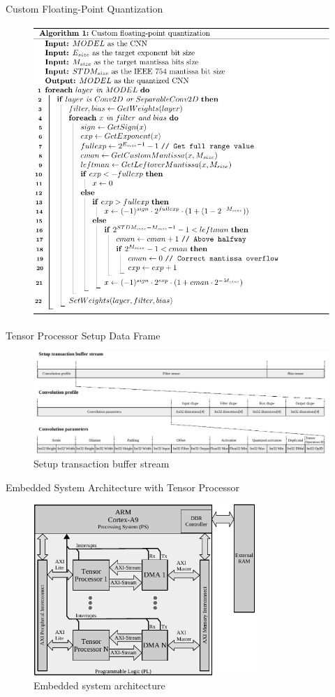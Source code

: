 \begin{frame}{Custom Floating-Point Quantization}
	\begin{figure}
		\centering
		\includegraphics[width=0.6\columnwidth]{slides/algorithm_fp_2.pdf}
	\end{figure}
	
\end{frame}

\begin{frame}{Tensor Processor Setup Data Frame}
	
	\begin{figure}
		\includegraphics[width=\textwidth]{../figures/setup_transaction_buffer_stream.pdf}
		\caption{Setup transaction buffer stream}
	\end{figure}
	
\end{frame}


\begin{frame}{Embedded System Architecture with Tensor Processor}
	\begin{figure}
		\includegraphics[width=0.75\textwidth]{../chapters/cnn_accelerator/figures/system_design.pdf} %
		\caption{Embedded system architecture}
	\end{figure}
\end{frame}

